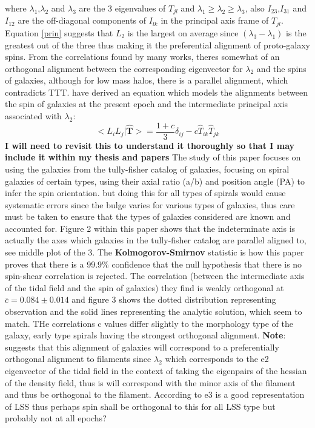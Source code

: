\documentclass[fleqn,usenatbib]{mnras}
\begin{document}
where $\lambda_{1}$,$\lambda_{2}$ and $\lambda_{3}$ are the 3 eigenvalues of $T_{jl}$ and $\lambda_{1} \geq \lambda_{2} \geq\lambda_{3}$, also $I_{23}$,$I_{31}$ and $I_{12}$ are the off-diagonal components of $I_{lk}$ in the principal axis frame of $T_{jl}$. Equation \ref{prin} suggests that $L_{2}$ is the largest on average since $(\lambda_{3}-\lambda_{1})$ is the greatest out of the three thus making it the preferential alignment of proto-galaxy spins. From the correlations found by many works, theres somewhat of an orthogonal alignment between the corresponding eigenvector for $\lambda_{2}$ and the spins of galaxies, although for low mass halos, there is a parallel alignment, which contradicts TTT. \citet{Lee_pen_00,Lee_Pen_01} have derived an equation which models the alignments between the spin of galaxies at the present epoch and the intermediate principal axis associated with $\lambda_{2}$:
\begin{equation}
\big<L_{i}L_{j}|\hat{\textbf{T}} \big>=\frac{1+c}{3}\delta_{ij}-c\hat{T}_{ik}\hat{T}_{jk}
\end{equation}
\textbf{I will need to revisit this to understand it thoroughly so that I may include it within my thesis and papers}
The study of this paper focuses on using the galaxies from the tully-fisher catalog of galaxies, focusing on spiral galaxies of certain types, using their axial ratio (a/b) and position angle (PA) to infer the spin orientation. but doing this for all types of spirals would cause systematic errors since the bulge varies for various types of galaxies, thus care must be taken to ensure that the types of galaxies considered are known and accounted for.
Figure 2 within this paper shows that the indeterminate axis is actually the axes which galaxies in the tully-fisher catalog are parallel aligned to, see middle plot of the 3.
The \textbf{Kolmogorov-Smirnov} statistic is how this paper proves that there is a 99.9$\%$ confidence that the null hypothesis that there is no spin-shear correlation is rejected. The correlation (between the intermediate axis of the tidal field and the spin of galaxies) they find is weakly orthogonal at $\bar{c}=0.084\pm 0.014$ and figure 3 shows the dotted distribution representing observation and the solid lines representing the analytic solution, which seem to match. THe correlations c values differ slightly to the morphology type of the galaxy, early type spirals having the strongest orthogonal alignment.
\textbf{Note}: \citet{Trowland_13} suggests that this alignment of galaxies will correspond to a preferentially orthogonal alignment to filaments since $\lambda_{2}$ which corresponds to the e2 eigenvector of the tidal field in the context of taking the eigenpairs of the hessian of the density field, thus is will correspond with the minor axis of the filament and thus be orthogonal to the filament. According to \citet{Wang_17} e3 is a good representation of LSS thus perhaps spin shall be orthogonal to this for all LSS type but probably not at all epochs?
\end{document}
